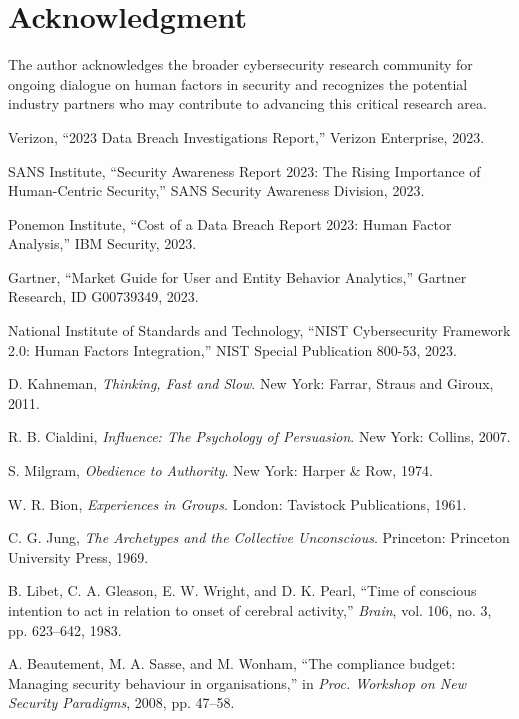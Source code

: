 \documentclass[10pt,twocolumn]{IEEEtran}
\begin{document}
\section*{Acknowledgment}

The author acknowledges the broader cybersecurity research community for ongoing dialogue on human factors in security and recognizes the potential industry partners who may contribute to advancing this critical research area.



\begin{thebibliography}{99}

Verizon, ``2023 Data Breach Investigations Report,'' Verizon Enterprise, 2023.

SANS Institute, ``Security Awareness Report 2023: The Rising Importance of Human-Centric Security,'' SANS Security Awareness Division, 2023.

Ponemon Institute, ``Cost of a Data Breach Report 2023: Human Factor Analysis,'' IBM Security, 2023.

Gartner, ``Market Guide for User and Entity Behavior Analytics,'' Gartner Research, ID G00739349, 2023.

National Institute of Standards and Technology, ``NIST Cybersecurity Framework 2.0: Human Factors Integration,'' NIST Special Publication 800-53, 2023.

D. Kahneman, \emph{Thinking, Fast and Slow}. New York: Farrar, Straus and Giroux, 2011.

R. B. Cialdini, \emph{Influence: The Psychology of Persuasion}. New York: Collins, 2007.

S. Milgram, \emph{Obedience to Authority}. New York: Harper \& Row, 1974.

W. R. Bion, \emph{Experiences in Groups}. London: Tavistock Publications, 1961.

C. G. Jung, \emph{The Archetypes and the Collective Unconscious}. Princeton: Princeton University Press, 1969.

B. Libet, C. A. Gleason, E. W. Wright, and D. K. Pearl, ``Time of conscious intention to act in relation to onset of cerebral activity,'' \emph{Brain}, vol. 106, no. 3, pp. 623--642, 1983.

A. Beautement, M. A. Sasse, and M. Wonham, ``The compliance budget: Managing security behaviour in organisations,'' in \emph{Proc. Workshop on New Security Paradigms}, 2008, pp. 47--58.


\end{thebibliography}
\end{document}
